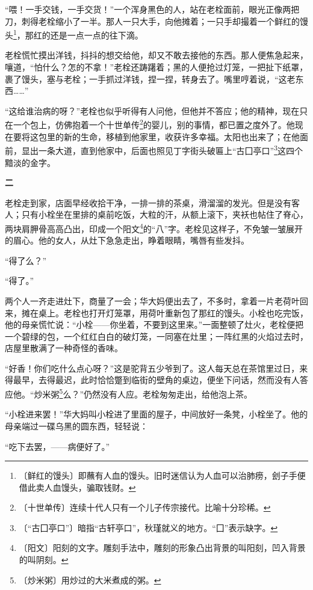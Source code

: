 \documentclass[12pt,UTF-8,openany]{ctexbook}
\begin{document}
\begin{normalsize}
    “喂！一手交钱，一手交货！”一个浑身黑色的人，站在老栓面前，眼光正像两把刀，刺得老栓缩小了一半。那人一只大手，向他摊着；一只手却撮着一个鲜红的馒头\footnote{〔鲜红的馒头〕即蘸有人血的馒头。旧时迷信认为人血可以治肺痨，刽子手便借此卖人血馒头，骗取钱财。}，那红的还是一点一点的往下滴。
    
    老栓慌忙摸出洋钱，抖抖的想交给他，却又不敢去接他的东西。那人便焦急起来，嚷道，“怕什么？怎的不拿！”老栓还踌躇着；黑的人便抢过灯笼，一把扯下纸罩，裹了馒头，塞与老栓；一手抓过洋钱，捏一捏，转身去了。嘴里哼着说，“这老东西……”
    
    “这给谁治病的呀？”老栓也似乎听得有人问他，但他并不答应；他的精神，现在只在一个包上，仿佛抱着一个十世单传\footnote{〔十世单传〕连续十代人只有一个儿子传宗接代。比喻十分珍稀。}的婴儿，别的事情，都已置之度外了。他现在要将这包里的新的生命，移植到他家里，收获许多幸福。太阳也出来了；在他面前，显出一条大道，直到他家中，后面也照见丁字街头破匾上“古囗亭口”\footnote{〔“古囗亭口”〕暗指“古轩亭口”，秋瑾就义的地方。“囗”表示缺字。}这四个黯淡的金字。
    
    \begin{center}\textbf{二}\end{center}
    
    老栓走到家，店面早经收拾干净，一排一排的茶桌，滑溜溜的发光。但是没有客人；只有小栓坐在里排的桌前吃饭，大粒的汗，从额上滚下，夹袄也帖住了脊心，两块肩胛骨高高凸出，印成一个阳文\footnote{〔阳文〕阳刻的文字。雕刻手法中，雕刻的形象凸出背景的叫阳刻，凹入背景的叫阴刻。}的“八”字。老栓见这样子，不免皱一皱展开的眉心。他的女人，从灶下急急走出，睁着眼睛，嘴唇有些发抖。
    
    “得了么？”
    
    “得了。”
    
    两个人一齐走进灶下，商量了一会；华大妈便出去了，不多时，拿着一片老荷叶回来，摊在桌上。老栓也打开灯笼罩，用荷叶重新包了那红的馒头。小栓也吃完饭，他的母亲慌忙说：“小栓——你坐着，不要到这里来。”一面整顿了灶火，老栓便把一个碧绿的包，一个红红白白的破灯笼，一同塞在灶里；一阵红黑的火焰过去时，店屋里散满了一种奇怪的香味。
    
    “好香！你们吃什么点心呀？”这是驼背五少爷到了。这人每天总在茶馆里过日，来得最早，去得最迟，此时恰恰蹩到临街的壁角的桌边，便坐下问话，然而没有人答应他。“炒米粥\footnote{〔炒米粥〕用炒过的大米煮成的粥。}么？”仍然没有人应。老栓匆匆走出，给他泡上茶。
    
    “小栓进来罢！”华大妈叫小栓进了里面的屋子，中间放好一条凳，小栓坐了。他的母亲端过一碟乌黑的圆东西，轻轻说：
    
    “吃下去罢，——病便好了。”
    

\end{normalsize}
\end{document}
